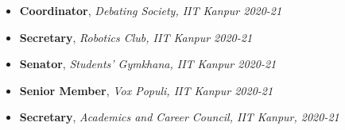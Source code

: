 
\begin{itemize}
\item \textbf{Coordinator}, \emph{Debating Society, IIT Kanpur 2020-21}
\item \textbf{Secretary}, \emph{Robotics Club, IIT Kanpur 2020-21}
\item \textbf{Senator}, \emph{Students' Gymkhana, IIT Kanpur 2020-21}
\item \textbf{Senior Member}, \emph{Vox Populi, IIT Kanpur 2020-21}
\item \textbf{Secretary}, \emph{Academics and Career Council, IIT Kanpur, 2020-21}
\end{itemize}
